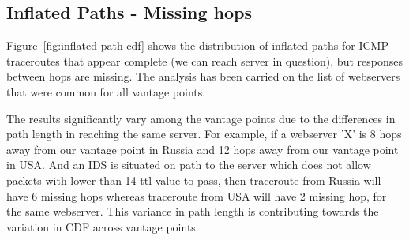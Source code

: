 \subsection{Inflated Paths - Missing hops}
Figure~\ref{fig:inflated-path-cdf} shows the distribution of inflated paths for ICMP traceroutes that appear complete (we can reach server in question), but responses between hops are missing. The analysis has been carried on the list of webservers that were common for all vantage points.

The results significantly vary among the vantage points due to the differences in path length in reaching the same server. For example, if a webserver 'X' is 8 hops away from our vantage point in Russia and 12 hops away from our vantage point in USA. And an IDS is situated on path to the server which does not allow packets with lower than 14 ttl value to pass, then traceroute from Russia  will have 6 missing hops whereas traceroute from USA will have 2 missing hop, for the same webserver. This variance in path length is contributing towards the variation in CDF across vantage points.
